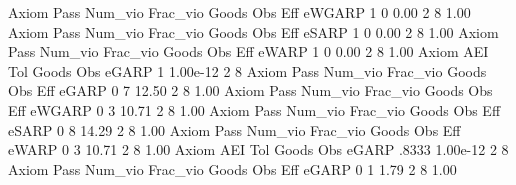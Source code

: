 {\smallskip}
       Axiom {\VBAR} Pass     Num_vio    Frac_vio       Goods         Obs         Eff  
      eWGARP {\VBAR}    1           0        0.00           2           8        1.00  
{\smallskip}
{\smallskip}
{\smallskip}
       Axiom {\VBAR} Pass     Num_vio    Frac_vio       Goods         Obs         Eff  
       eSARP {\VBAR}    1           0        0.00           2           8        1.00  
{\smallskip}
{\smallskip}
{\smallskip}
       Axiom {\VBAR} Pass     Num_vio    Frac_vio       Goods         Obs         Eff  
       eWARP {\VBAR}    1           0        0.00           2           8        1.00  
{\smallskip}
       Axiom {\VBAR}       AEI        Tol      Goods        Obs 
       eGARP {\VBAR}         1   1.00e-12          2          8 
{\smallskip}
{\smallskip}
{\smallskip}
       Axiom {\VBAR} Pass     Num_vio    Frac_vio       Goods         Obs         Eff  
       eGARP {\VBAR}    0           7       12.50           2           8        1.00  
{\smallskip}
{\smallskip}
{\smallskip}
       Axiom {\VBAR} Pass     Num_vio    Frac_vio       Goods         Obs         Eff  
      eWGARP {\VBAR}    0           3       10.71           2           8        1.00  
{\smallskip}
{\smallskip}
{\smallskip}
       Axiom {\VBAR} Pass     Num_vio    Frac_vio       Goods         Obs         Eff  
       eSARP {\VBAR}    0           8       14.29           2           8        1.00  
{\smallskip}
{\smallskip}
{\smallskip}
       Axiom {\VBAR} Pass     Num_vio    Frac_vio       Goods         Obs         Eff  
       eWARP {\VBAR}    0           3       10.71           2           8        1.00  
{\smallskip}
       Axiom {\VBAR}       AEI        Tol      Goods        Obs 
       eGARP {\VBAR}     .8333   1.00e-12          2          8 
{\smallskip}
{\smallskip}
{\smallskip}
       Axiom {\VBAR} Pass     Num_vio    Frac_vio       Goods         Obs         Eff  
       eGARP {\VBAR}    0           1        1.79           2           8        1.00  
